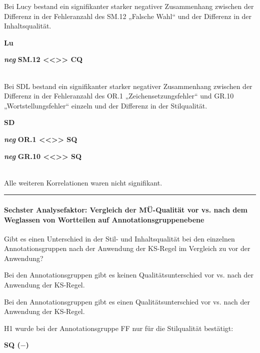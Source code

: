 \medskip
\noindent
\parbox[t]{.7\textwidth}{
Bei Lucy bestand ein signifikanter starker negativer Zusammenhang zwischen der Differenz in der Fehleranzahl des SM.12 „Falsche Wahl“ und der Differenz in der Inhaltsqualität.
}
\parbox[t]{.04\textwidth}{}
\colorbox{smGreen}{\parbox[t]{.25\textwidth}{
{ \textbf{Lu}}

\textbf{\textit{neg}} \textbf{SM.12 <{}<{}>{}> CQ}\\
\\
}}

\medskip
\noindent
\parbox[t]{.7\textwidth}{
Bei SDL bestand ein signifikanter starker negativer Zusammenhang zwischen der Differenz in der Fehleranzahl des OR.1 „Zeichensetzungsfehler“ und GR.10 „Wortstellungsfehler“ einzeln und der Differenz in der Stilqualität.
}
\parbox[t]{.04\textwidth}{}
\colorbox{smGreen}{\parbox[t]{.25\textwidth}{
{ \textbf{SD}}

{ \textbf{\textit{neg}} \textbf{OR.1 <{}<{}>{}> SQ}}

\textbf{\textit{neg}} \textbf{GR.10 <{}<{}>{}> SQ}\\
\\
}}

\medskip
\noindent
\parbox[t]{.7\textwidth}{Alle weiteren Korrelationen waren nicht signifikant.}
\parbox[t]{.04\textwidth}{}
\parbox[t]{.25\textwidth}{}
\smallskip
\hrule
\paragraph*{Sechster Analysefaktor: Vergleich der MÜ-Qualität vor vs. nach dem Weglassen von Wortteilen auf Annotationsgruppenebene}
\begin{description}[font=\normalfont\bfseries]
\item [Fragestellung:] Gibt es einen Unterschied in der Stil- und Inhaltsqualität bei den einzelnen Annotationsgruppen nach der Anwendung der KS-Regel im Vergleich zu vor der Anwendung?
\item [H0 --] Bei den Annotationsgruppen gibt es keinen Qualitätsunterschied vor vs. nach der Anwendung der KS-Regel.
\item [H1 --] Bei den Annotationsgruppen gibt es einen Qualitätsunterschied vor vs. nach der Anwendung der KS-Regel.
\item [Resultat]
\end{description}
\noindent
\parbox[t]{.8\textwidth}{
H1 wurde bei der Annotationsgruppe FF nur für die Stilqualität bestätigt:
}
\parbox[t]{.04\textwidth}{}
\colorbox{smGreen}{\parbox[t]{.15\textwidth}{\textbf{SQ ($-$)}\\}}

